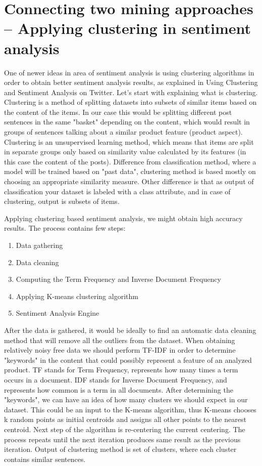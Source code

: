 \section{Connecting two mining approaches – Applying clustering in sentiment analysis}

One of newer ideas in area of sentiment analysis is using clustering algorithms in order to obtain better sentiment analysis results, as explained in Using Clustering and Sentiment Analysis on Twitter\cite{Clustering}. Let's start with explaining what is clustering. Clustering is a method of splitting datasets into subsets of similar items based on the content of the items. In our case this would be splitting different post sentences in the same "basket" depending on the content, which would result in groups of sentences talking about a similar product feature (product aspect). 
Clustering is an unsupervised learning method, which means that items are split in separate groups only based on similarity value calculated by its features (in this case the content of the posts). Difference from classification method, where a model will be trained based on "past data", clustering method is based mostly on choosing an appropriate similarity measure. Other difference is that as output of classification your dataset is labeled with a class attribute, and in case of clustering, output is subsets of items. 

Applying clustering based sentiment analysis, we might obtain high accuracy results. The process contains few steps: 
\begin{enumerate}
	\item Data gathering
	\item Data cleaning
	\item Computing the Term Frequency and Inverse Document Frequency
	\item Applying K-means clustering algorithm
	\item Sentiment Analysis Engine
\end{enumerate}

After the data is gathered, it would be ideally to find an automatic data cleaning method that will remove all the outliers from the dataset. When obtaining relatively noisy free data we should perform TF-IDF in order to determine "keywords" in the content that could possibly represent a feature of an analyzed product. TF stands for Term Frequency, represents how many times a term occurs in a document. IDF stands for Inverse Document Frequency, and represents how common is a term in all documents. 
After determining the "keywords", we can have an idea of how many clusters we should expect in our dataset. This could be an input to the K-means algorithm, thus K-means chooses k random points as initial centroids and assigns all other points to the nearest centroid. Next step of the algorithm is re-centering the current centering. The process repeats until the next iteration produces same result as the previous iteration. Output of clustering method is set of clusters, where each cluster contains similar sentences. 

